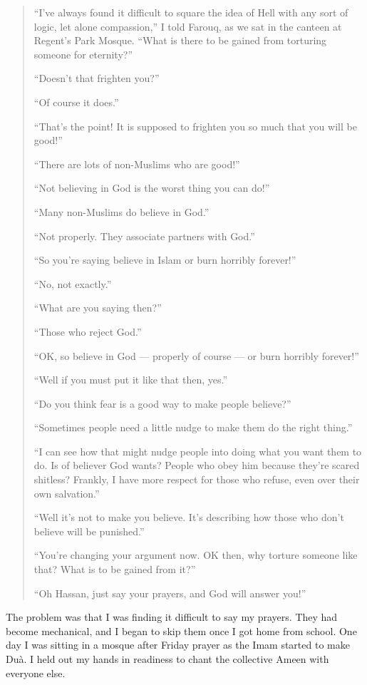 \documentclass[12pt]{memoir}
\begin{document}
\begin{quote}
“I’ve always found it difficult to square
the idea of Hell with any sort of logic, let alone compassion,”
I told Farouq, as we sat in the canteen at Regent’s Park Mosque.
“What is there to be gained from torturing someone for eternity?”

“Doesn’t that frighten you?”

“Of course it does.”

“That’s the point!
It is supposed to frighten you so much that you will be good!”

“There are lots of non-Muslims who are good!”

“Not believing in God is the worst thing you can do!”

“Many non-Muslims do believe in God.”

“Not properly.
They associate partners with God.”

“So you’re saying believe in Islam or burn horribly forever!”

“No, not exactly.”

“What are you saying then?”

“Those who reject God.”

“OK, so believe in God — properly of course — or burn horribly forever!”

“Well if you must put it like that then, yes.”

“Do you think fear is a good way to make people believe?”

“Sometimes people need a little nudge to make them do the right thing.”

“I can see how that might nudge people into doing what you want them to do.
Is  of believer God wants?
People who obey him because they’re scared shitless?
Frankly, I have more respect for those who refuse,
even over their own salvation.”

“Well it’s not to make you believe.
It’s describing how those who don’t believe will be punished.”

“You’re changing your argument now.
OK then, why torture someone like that? What is to be gained from it?”

“Oh Hassan, just say your prayers, and God will answer you!”
\end{quote}

The problem was that I was finding it difficult to say my prayers.
They had become mechanical,
and I began to skip them once I got home from school.
One day I was sitting in a mosque after Friday prayer
as the Imam started to make Du\`a.
I held out my hands in readiness
to chant the collective Ameen with everyone else.
\end{document}
